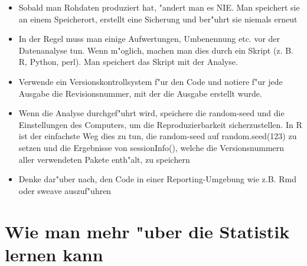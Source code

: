 \documentclass[a4paper,twoside]{tufte-book}\usepackage[]{graphicx}\usepackage[]{color}
\begin{document}
\begin{itemize}

\item{Sobald man Rohdaten produziert hat, "andert man es NIE. Man speichert sie an einem Speicherort, erstellt eine Sicherung und ber"uhrt sie niemals erneut}

\item{In der Regel muss man einige Aufwertungen, Umbenennung etc. vor der Datenanalyse tun. Wenn m"oglich, machen man dies durch ein Skript (z. B. R, Python, perl). Man speichert das Skript mit der Analyse.}

\item{Verwende ein Versionskontrollsystem f"ur den Code und notiere f"ur jede Ausgabe die Revisionsnummer, mit der die Ausgabe erstellt wurde.}

\item{Wenn die Analyse durchgef"uhrt wird, speichere die random-seed und die Einstellungen des Computers, um die Reproduzierbarkeit sicherzustellen. In R ist der einfachste Weg dies zu tun, die random-seed auf random.seed(123) zu setzen und die Ergebnisse von sessionInfo(), welche die Versionsnummern aller verwendeten Pakete enth"alt, zu speichern}

\item{Denke dar"uber nach, den Code in einer Reporting-Umgebung wie z.B. Rmd oder sweave auszuf"uhren}



\end{itemize}

\section{Wie man mehr "uber die Statistik lernen kann}\label{sec: further readings}
\end{document}
